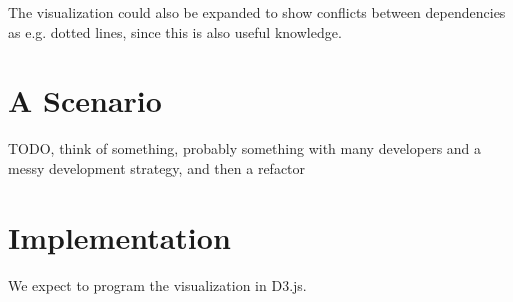 \documentclass[a4paper,12pt]{article}
\begin{document}
The visualization could also be expanded to show conflicts between dependencies
as e.g. dotted lines, since this is also useful knowledge.


\section{A Scenario}

TODO, think of something, probably something with many developers and a messy
development strategy, and then a refactor


\section{Implementation}

We expect to program the visualization in D3.js.
\end{document}
